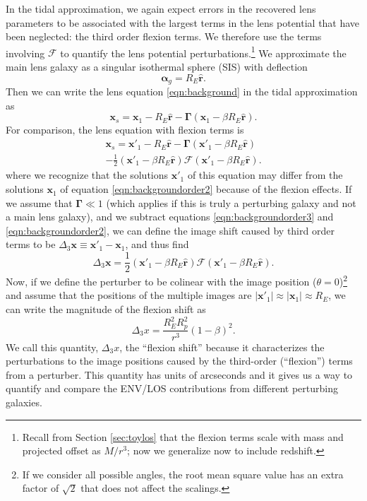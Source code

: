 \documentclass{emulateapj}
\newcommand\GammaMat[0]{\boldsymbol{\Gamma}}
\newcommand\x[0]{\mathbf{x}}
\renewcommand\vec[1]{\mathbf{#1}}
\newcommand\al[0]{\boldsymbol{\alpha}}
\newcommand\rhat[0]{\vec{\hat{r}}}
\newcommand\sF{{\mathcal F}}
\begin{document}
In the tidal approximation, we again expect errors in the recovered lens parameters to be associated with the largest terms in the lens potential that have been neglected: the third order flexion terms.  We therefore use the terms involving $\sF$ to quantify the lens potential perturbations.\footnote{Recall from Section \ref{sec:toylos} that the flexion terms scale with mass and projected offset as $M / r^3$; now we generalize now to include redshift.}  We approximate the main lens galaxy as a singular isothermal sphere (SIS) with deflection
\begin{equation}
\al_g = R_E \rhat.
\end{equation}
Then we can write the lens equation \ref{eqn:background} in the tidal approximation as
\begin{equation}
\label{eqn:backgroundorder2}
\x_s = \x_1 - R_E \rhat -  \GammaMat (\x_1 - \beta R_E \rhat).
\end{equation}
For comparison, the lens equation with flexion terms is
\begin{multline}
\x_s = \x'_1 - R_E\rhat -  \GammaMat(\x'_1 - \beta R_E\rhat) \\
- \frac{1}{2}(\x'_1 - \beta R_E\rhat) \sF (\x'_1 - \beta R_E \rhat).
\label{eqn:backgroundorder3}
\end{multline}
where we recognize that the solutions $\x'_1$ of this equation may differ from the solutions $\x_1$ of equation \ref{eqn:backgroundorder2} because of the flexion effects.  If we assume that $\GammaMat \ll 1$ (which applies if this is truly a perturbing galaxy and not a main lens galaxy), and we subtract equations \ref{eqn:backgroundorder3} and \ref{eqn:backgroundorder2}, we can define the image shift caused by third order terms to be $\Delta_3 \x \equiv \x'_1 - \x_1$, and thus find
\begin{equation}
\Delta_3 \x = \frac{1}{2} (\x'_1 - \beta R_E \rhat) \sF (\x'_1 - \beta R_E \rhat).
\end{equation}
Now, if we define the perturber to be colinear with the image position ($\theta  = 0$)\footnote{If we consider all possible angles, the root mean square value has an extra factor of $\sqrt{2}$ that does not affect the scalings.} and assume that the positions of the multiple images are $|\x'_1| \approx |\x_1| \approx R_E$, we can write the magnitude of the flexion shift as
\begin{equation}
\Delta_3 x = \frac{R_E^2 R_p^2}{r^3} (1 - \beta)^2. 
\label{eqn:backgroundd3x}
\end{equation}
We call this quantity, $\Delta_3 x$, the ``flexion shift'' because it characterizes the perturbations to the image positions caused by the third-order (``flexion'') terms from a perturber. This quantity has units of arcseconds and it gives us a way to quantify and compare the ENV/LOS contributions from different perturbing galaxies.
\end{document}
